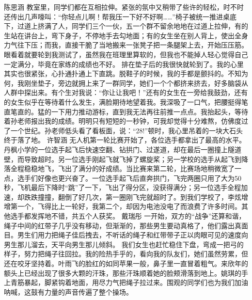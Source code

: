 \markdownRendererDocumentBegin
{}\markdownRendererInterblockSeparator
{}\markdownRendererInterblockSeparator
{}陈思涵\markdownRendererInterblockSeparator
{}教室里，同学们都在互相拉伸。紧张的氛中又稍带了些许的轻松，时不时还传出几声嚎叫：“你轻点儿啊！帮我压一下好不好啊……”椅子被统一推进桌底下，过道上挤满了人，同学们三个一伙，五一个群不留余地地在过道上拉伸，有的生站在讲台上，弯下身子，不停地手去勾地面；有的女生坐在别人背上，使出全身力气往下压；而我，直接干脆了当地搬来一张凳子把一条腿架上去，开始压压筋。眼看着就要轮到我测试了，虽然我在班理里算软的，但我也不能掉人轻心觉得自己一定满分，毕竟在家练的成绩也不好。\markdownRendererInterblockSeparator
{}排在垫子后的我很快就轮到了。我的心里其实也很紧张，心扑通扑通上下直跳。脱鞋子的时候，我的手都是颤抖的。不知为何，我刚坐垫子，旁边就拥上来了一群同学，她们一个个都挤来挤去，好多脑袋从人群中探出来。有个生对我说：“你让让我吧！”还有的女生在一旁给我鼓劲，还有的女生似乎在等待着什么发生，满脸期待地望着我。我深吸了一口气，把腰挺得笔直笔直的。猛的一下用力推动游标，直到我无法再往前推一点点。我抬起头，等待着孙老师报出我的成绩。明明只有短短的一秒钟，可我却觉得十分难熬，仿佛度过了一个世纪。孙老师低头看了看板面，说：“28!”顿时，我心里吊着的一块大石头终于落了地。\markdownRendererInterblockSeparator
{}\markdownRendererInterblockSeparator
{}许智涵\markdownRendererInterblockSeparator
{}无人机第一轮比赛开始了，各位选手都拿出了最高的水平。丹枫小学的一位选手起飞后快速空翻、钻拱门、过遂道，却在最后一圈撞上隧道壁，而导致超时。另一位选手刚起飞就飞掉了螺旋桨；另一学校的选手从起飞到降落全程稳稳地飞，飞出了满分的好成绩。当比赛来第二轮，比赛场地稍微宽了一点，选手们好像也更兴奋了。一位选手起飞后直奔拱门，飞完两圈只用了大为50秒，飞机最后下降时“跳”了一下，飞出了得分区，没获得满分；另一位选手全程加速，却跌跌撞撞，翻倒了好几次，第一圈刚飞完就超时了。到我们学校了，李炫增增第一个，飞得比上一轮好，我第二个，却因为电池没电了而浪费了许多时间。其他选手都发挥地不错，共五个人获奖。\markdownRendererInterblockSeparator
{}\markdownRendererInterblockSeparator
{}戴瑞彤\markdownRendererInterblockSeparator
{}一开始，双方的“战争”还算和谐，绳子中间的红带子几乎没有移动，但渐渐的，那些男生要动真格了，他们露出真面目。男生们用力把绳子佳后拽去，不听话的绳子和红带带子正以肉眼可见的速度向男生那儿溜去，天平向男生那儿倾斜。\markdownRendererInterblockSeparator
{}我们女生也赶忙稳住下盘，弯成一把弓的样子，努力把绳子往回拉。我的险热手乎的，看向我的队友们，她们虽然劳累，但还在咬牙坚持着。叶雨飞的脸红的如同苹果一般，鼻子里一直冒着粗气。来欣年的额头上已经出现了很多大颗的汗珠，那些汗珠顺着她的脸颊滑落到地上。姚琪的手上青筋暴起，脚紧钩着地面，用尽力气把绳子拉过来。围观的同学们也为我们加油呐喊，这鼓有力量的声音传遍了整个操场。\markdownRendererInterblockSeparator

